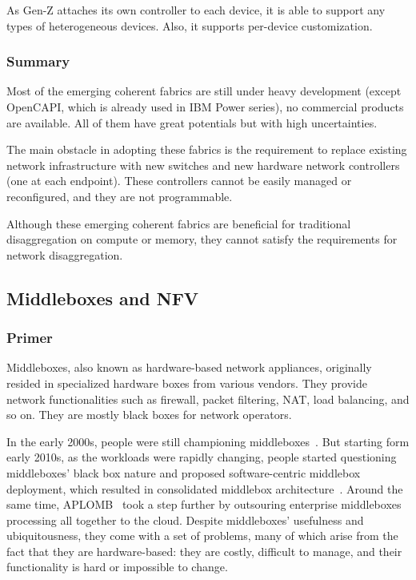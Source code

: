 As Gen-Z attaches its own controller to each device,
it is able to support any types of heterogeneous devices.
Also, it supports per-device customization.

\subsubsection{Summary}

Most of the emerging coherent fabrics are still under heavy development
(except OpenCAPI, which is already used in IBM Power series), no commercial
products are available. All of them have great potentials but with high uncertainties.

The main obstacle in adopting these fabrics is the requirement to
replace existing network infrastructure with new switches and new hardware network controllers (one at each endpoint).
These controllers cannot be easily managed or reconfigured, and they are not programmable.

Although these emerging coherent fabrics
are beneficial for traditional disaggregation on compute or memory,
they cannot satisfy the requirements for network disaggregation.

\subsection{Middleboxes and NFV}
\subsubsection{Primer}

Middleboxes, also known as hardware-based network appliances, originally
resided in specialized hardware boxes from various vendors.
They provide network functionalities such as firewall, packet filtering,
NAT, load balancing, and so on.
They are mostly black boxes for network operators.

In the early 2000s, people were still championing middleboxes~\cite{walfish-osdi04}.
But starting form early 2010s, as the workloads were rapidly changing,
people started questioning middleboxes' black box nature
and proposed software-centric middlebox deployment,
which resulted in consolidated middlebox architecture~\cite{comb-nsdi12}.
Around the same time, APLOMB~\cite{aplomb-sigcomm20} took a step further
by outsouring enterprise middleboxes processing all together to the cloud.
Despite middleboxes' usefulness and ubiquitousness, they come with
a set of problems, many of which arise from the fact that they are
hardware-based: they are costly, difficult to manage, and their
functionality is hard or impossible to change.

